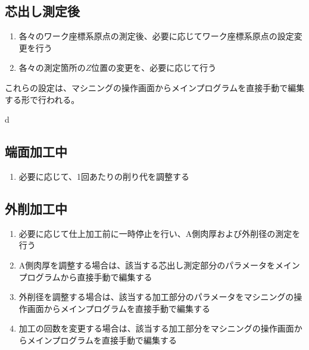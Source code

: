 \clearpage


\subsection{芯出し測定後}
\begin{enumerate}
\item 各々のワーク座標系原点の測定後、必要に応じてワーク座標系原点の設定変更を行う
\item 各々の測定箇所の$Z$位置の変更を、必要に応じて行う
\end{enumerate}
これらの設定は、マシニングの操作画面からメインプログラムを直接手動で編集する形で行われる。

d
\subsection{端面加工中}
\begin{enumerate}
\item 必要に応じて、1回あたりの削り代を調整する
\end{enumerate}


\subsection{外削加工中}
\begin{enumerate}
\item 必要に応じて仕上加工前に一時停止を行い、A側肉厚および外削径の測定を行う
\item A側肉厚を調整する場合は、該当する芯出し測定部分のパラメータをメインプログラムから直接手動で編集する
\item 外削径を調整する場合は、該当する加工部分のパラメータをマシニングの操作画面からメインプログラムを直接手動で編集する
\item {}加工の回数を変更する場合は、該当する加工部分をマシニングの操作画面からメインプログラムを直接手動で編集する
\end{enumerate}


